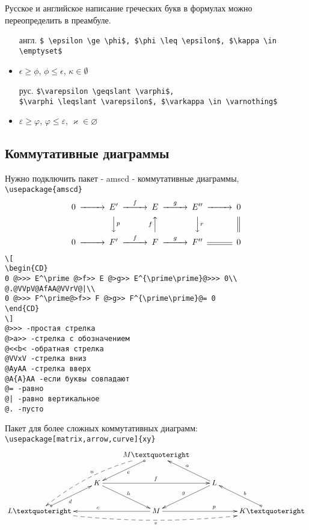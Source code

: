\documentclass[a4paper,12pt]{article}%
\theoremstyle{plain}%
\theoremstyle{definition}%
\theoremstyle{remark}%
\begin{document}
\noindent Русское и английское написание греческих букв в формулах можно переопределить в преамбуле.
\begin{itemize}
\item[англ.] \verb|$ \epsilon \ge \phi$, $\phi \leq \epsilon$, $\kappa \in \emptyset$|
\item $ \epsilon \ge \phi$, $\phi \leq \epsilon$, $\kappa \in \emptyset$
\item[рус.] \verb|$\varepsilon \geqslant \varphi$,| \\\verb|$\varphi \leqslant \varepsilon$, $\varkappa \in \varnothing$|
\item $\varepsilon \geqslant \varphi$, $\varphi \leqslant \varepsilon$, $\varkappa \in \varnothing$
\end{itemize}



\subsection{Коммутативные диаграммы}

Нужно подключить пакет - amscd - коммутативные диаграммы, \verb|\usepackage{amscd}|
\[
\begin{CD}
0 @>>> E^\prime @>f>> E @>g>> E^{\prime\prime}@>>> 0\\ %
@.@VVpV@AfAA@VVrV@|\\ %
0 @>>> F^\prime@>f>> F @>g>> F^{\prime\prime}@= 0 %
\end{CD}
\]
\begin{verbatim}
\[
\begin{CD}
0 @>>> E^\prime @>f>> E @>g>> E^{\prime\prime}@>>> 0\\
@.@VVpV@AfAA@VVrV@|\\
0 @>>> F^\prime@>f>> F @>g>> F^{\prime\prime}@= 0
\end{CD}
\]
@>>> -простая стрелка
@>a>> -стрелка с обозначением
@<<b< -обратная стрелка
@VVxV -стрелка вниз
@AyAA -стрелка вверх
@A{A}AA -если буквы совпадают
@= -равно
@| -равно вертикальное
@. -пусто
\end{verbatim}

Пакет для более сложных коммутативных диаграмм: \\
\verb|\usepackage[matrix,arrow,curve]{xy}|
$$ 
\xymatrix{ 
&& M’\ar@{o->}[dl]^e \ar@/_1pc/@{-->}[ddll]_u\\ 
& K\ar[rr]^f \ar[dr]^h && L \ar[ul]_a \ar[dl]_g\\ 
L’\ar@{o->}[ur]_d \ar@/_1pc/@{-->}[rrrr]_v && 
M\ar[rr]^p \ar[ll]_c && K’\ar@{o->}[ul]_b 
} 
$$
\end{document}
